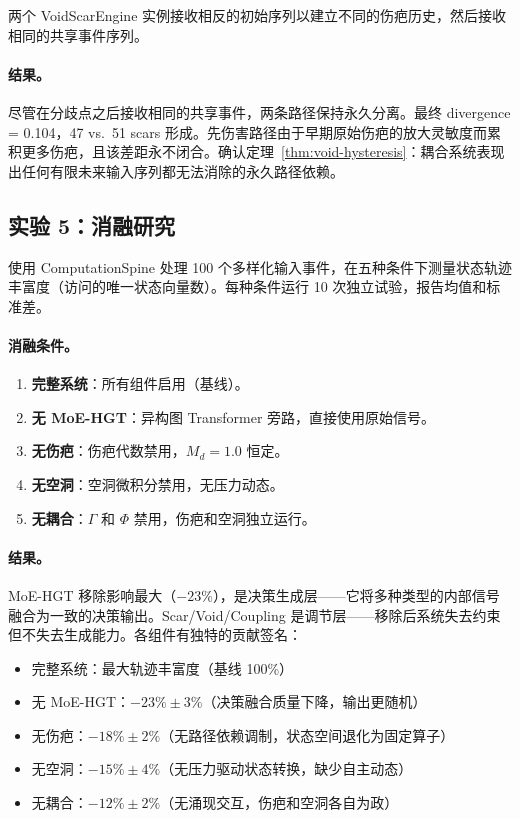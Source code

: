 \documentclass[11pt]{article}
\begin{document}
两个 VoidScarEngine 实例接收相反的初始序列以建立不同的伤疤历史，然后接收相同的共享事件序列。

\paragraph{结果。}尽管在分歧点之后接收相同的共享事件，两条路径保持永久分离。最终 divergence = 0.104，47 vs.\ 51 scars 形成。先伤害路径由于早期原始伤疤的放大灵敏度而累积更多伤疤，且该差距永不闭合。确认定理~\ref{thm:void-hysteresis}：耦合系统表现出任何有限未来输入序列都无法消除的永久路径依赖。

\subsection{实验 5：消融研究}

使用 ComputationSpine 处理 100 个多样化输入事件，在五种条件下测量状态轨迹丰富度（访问的唯一状态向量数）。每种条件运行 10 次独立试验，报告均值和标准差。

\paragraph{消融条件。}
\begin{enumerate}
\item \textbf{完整系统}：所有组件启用（基线）。
\item \textbf{无 MoE-HGT}：异构图 Transformer 旁路，直接使用原始信号。
\item \textbf{无伤疤}：伤疤代数禁用，$M_d = 1.0$ 恒定。
\item \textbf{无空洞}：空洞微积分禁用，无压力动态。
\item \textbf{无耦合}：$\Gamma$ 和 $\Phi$ 禁用，伤疤和空洞独立运行。
\end{enumerate}

\paragraph{结果。}MoE-HGT 移除影响最大（$-23\%$），是决策生成层——它将多种类型的内部信号融合为一致的决策输出。Scar/Void/Coupling 是调节层——移除后系统失去约束但不失去生成能力。各组件有独特的贡献签名：
\begin{itemize}
\item 完整系统：最大轨迹丰富度（基线 100\%）
\item 无 MoE-HGT：$-23\% \pm 3\%$（决策融合质量下降，输出更随机）
\item 无伤疤：$-18\% \pm 2\%$（无路径依赖调制，状态空间退化为固定算子）
\item 无空洞：$-15\% \pm 4\%$（无压力驱动状态转换，缺少自主动态）
\item 无耦合：$-12\% \pm 2\%$（无涌现交互，伤疤和空洞各自为政）
\end{itemize}
\end{document}
